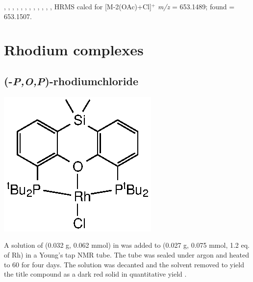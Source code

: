 ,
,
,
,
,
,
,
,
,
,
,
,
HRMS calcd for  [M-2(OAc)+Cl]$^+$ \emph{m/z} = 653.1489; found = 653.1507.


\section{Rhodium complexes}


\subsection*{(\tBuSixantphosk-\emph{P,O,P})-rhodiumchloride}

\begin{structure}[h]
\begin{center}
\includegraphics{../Structures/SitBuRhCl.eps}
\end{center}
\end{structure}

A solution of \tBusixantphos{} (0.032 g, 0.062 mmol) in  was added to  (0.027 g, 0.075 mmol, 1.2 eq. of Rh) in a Young's tap NMR tube.  The tube was sealed under argon and heated to 60 \degC{} for four days.  The solution was decanted and the solvent removed  to yield the title compound as a dark red solid in quantitative yield .  

